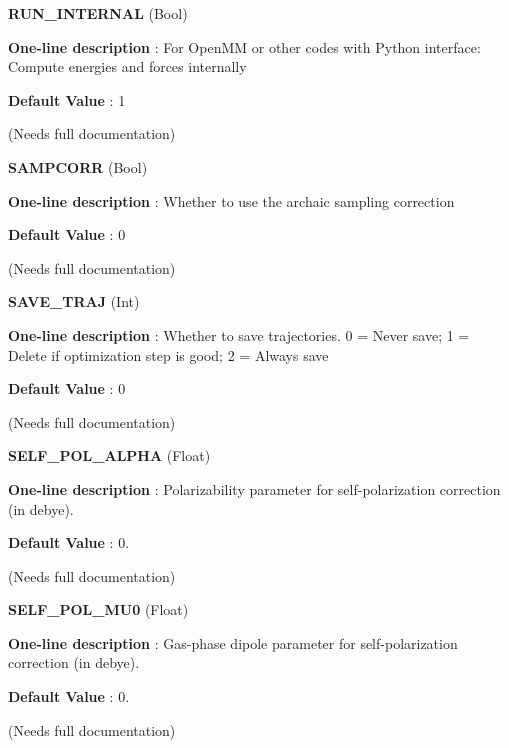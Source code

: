 \begin{DoxyItemize}
\item {\bfseries  \-R\-U\-N\-\_\-\-I\-N\-T\-E\-R\-N\-A\-L } (\-Bool) \par
{\bfseries  \-One-\/line description }\-: \-For \-Open\-M\-M or other codes with \-Python interface\-: \-Compute energies and forces internally \par
{\bfseries  \-Default \-Value }\-: 1 \par
(\-Needs full documentation)\end{DoxyItemize}
\begin{DoxyItemize}
\item {\bfseries  \-S\-A\-M\-P\-C\-O\-R\-R } (\-Bool) \par
{\bfseries  \-One-\/line description }\-: \-Whether to use the archaic sampling correction \par
{\bfseries  \-Default \-Value }\-: 0 \par
(\-Needs full documentation)\end{DoxyItemize}
\begin{DoxyItemize}
\item {\bfseries  \-S\-A\-V\-E\-\_\-\-T\-R\-A\-J } (\-Int) \par
{\bfseries  \-One-\/line description }\-: \-Whether to save trajectories. 0 = \-Never save; 1 = \-Delete if optimization step is good; 2 = \-Always save \par
{\bfseries  \-Default \-Value }\-: 0 \par
(\-Needs full documentation)\end{DoxyItemize}
\begin{DoxyItemize}
\item {\bfseries  \-S\-E\-L\-F\-\_\-\-P\-O\-L\-\_\-\-A\-L\-P\-H\-A } (\-Float) \par
{\bfseries  \-One-\/line description }\-: \-Polarizability parameter for self-\/polarization correction (in debye). \par
{\bfseries  \-Default \-Value }\-: 0. \par
(\-Needs full documentation)\end{DoxyItemize}
\begin{DoxyItemize}
\item {\bfseries  \-S\-E\-L\-F\-\_\-\-P\-O\-L\-\_\-\-M\-U0 } (\-Float) \par
{\bfseries  \-One-\/line description }\-: \-Gas-\/phase dipole parameter for self-\/polarization correction (in debye). \par
{\bfseries  \-Default \-Value }\-: 0. \par
(\-Needs full documentation)\end{DoxyItemize}
